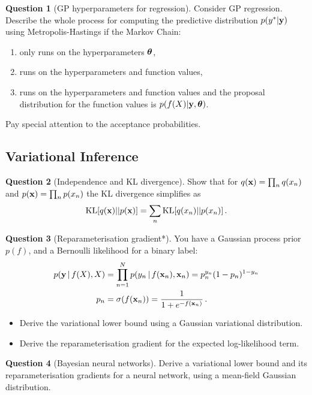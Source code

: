 \documentclass[a4paper]{article}
\theoremstyle{definition}
\newtheorem{question}{Question}
\begin{document}
\begin{question}[GP hyperparameters for regression]
Consider GP regression. Describe the whole process for computing the predictive distribution $p(y^*|\mathbf{y})$ using Metropolis-Hastings if the Markov Chain:
\begin{enumerate}
  \item only runs on the hyperparameters $\boldsymbol{\theta}$,
  \item runs on the hyperparameters and function values,
  \item runs on the hyperparameters and function values and the proposal distribution for the function values is $p(f(X)|\mathbf{y}, \boldsymbol{\theta})$.
\end{enumerate}
Pay special attention to the acceptance probabilities.
\end{question}



\subsection{Variational Inference}
\begin{question}[Independence and KL divergence]
Show that for $q(\mathbf{x}) = \prod_n q(x_n)$ and $p(\mathbf{x}) = \prod_n p(x_n)$ the KL divergence simplifies as
\begin{align}
\KL{q(\vx)}{p(\vx)} = \sum_n \KL{q(x_n)}{p(x_n)} \,.
\end{align}
\end{question}


\begin{question}[Reparameterisation gradient*]
\label{q:gradients}
You have a Gaussian process prior $p(f)$, and a Bernoulli likelihood for a binary label:
\begin{align}
p(\mathbf{y}\,|\, f(X), X) &= \prod_{n=1}^N p(y_n\,|\, f(\mathbf{x}_n), \mathbf{x}_n) = p_n^{y_n}(1-p_n)^{1 - y_n} \\
p_n &= \sigma(f(\mathbf{x}_n)) = \frac{1}{1 + e^{-f(\mathbf{x}_n)}} \,.
\end{align}
\begin{itemize}
  \item Derive the variational lower bound using a Gaussian variational distribution.
  \item Derive the reparameterisation gradient for the expected log-likelihood term.
\end{itemize}
\end{question}


\begin{question}[Bayesian neural networks]
\label{q:bnn}
Derive a variational lower bound and its reparameterisation gradients for a neural network, using a mean-field Gaussian distribution.
\end{question}
\end{document}
